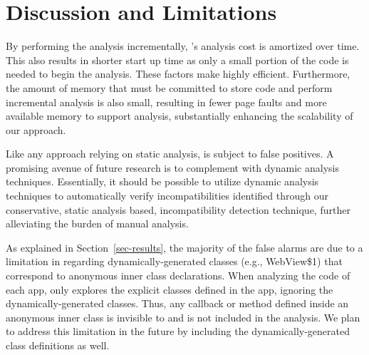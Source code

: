 \section{Discussion and Limitations}\label{sec-discussion}


By performing the analysis incrementally, \@approach's
analysis cost is amortized over time.  This also
results in shorter start up time as only a small
portion of the code is needed to begin the analysis.
These factors make \@approach highly efficient.  Furthermore, the amount of memory that must be committed to store code
and perform incremental analysis is also small,
resulting in fewer page faults and more available
memory to support analysis, substantially enhancing the
scalability of our approach. 

Like any approach relying on static analysis, \@approach is subject
to false positives. A promising avenue of future research is
to complement \@approach with dynamic analysis techniques.
Essentially, it should be possible to utilize dynamic
analysis techniques to automatically verify
incompatibilities identified through our conservative,
static analysis based, incompatibility detection technique,
further alleviating the burden of manual analysis.

As explained in Section~\ref{sec-results}, the majority of the
false alarms are due to a limitation in \@approach regarding
dynamically-generated classes (e.g., {\sf WebView\$1}) that
correspond to anonymous inner class declarations.  When
analyzing the code of each app, \@approach only explores the
explicit classes defined in the app, ignoring the
dynamically-generated classes. Thus, any callback or method
defined inside an anonymous inner class is invisible to
\@approach and is not included in the analysis. We plan to
address this limitation in the future by including the
dynamically-generated class definitions as well.


